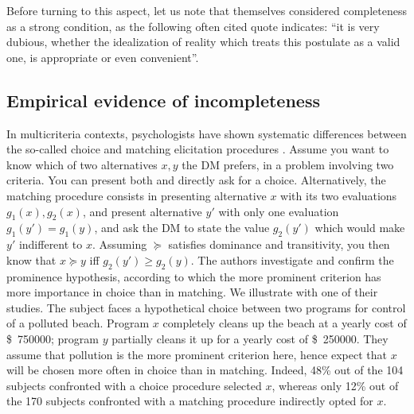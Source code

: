 \documentclass[french, english]{llncs}
\newcommand{\dollars}[1]{\SI{#1}[\$]{}}
\begin{document}
	Before turning to this aspect, let us note that \citet[p. 630]{von_neumann_theory_1953} \citep[also]{von_neumann_theory_2004} themselves considered completeness as a strong condition, as the following often cited quote indicates: “it is very dubious, whether the idealization of reality which treats this postulate as a valid one, is appropriate or even convenient”.

	\subsection{Empirical evidence of incompleteness}
	
	In multicriteria contexts, psychologists have shown systematic differences between the so-called choice and matching elicitation procedures \citep{tversky_contingent_1988}. Assume you want to know which of two alternatives $x, y$ the \ac{DM} prefers, in a problem involving two criteria. You can present both and directly ask for a choice. Alternatively, the matching procedure consists in presenting alternative $x$ with its two evaluations $g_1(x), g_2(x)$, and present alternative $y'$ with only one evaluation $g_1(y') = g_1(y)$, and ask the \ac{DM} to state the value $g_2(y')$ which would make $y'$ indifferent to $x$. Assuming $\succeq$ satisfies dominance and transitivity, you then know that $x \succeq y$ iff $g_2(y') ≥ g_2(y)$. The authors investigate and confirm the prominence hypothesis, according to which the more prominent criterion has more importance in choice than in matching. We illustrate with one of their studies. The subject faces a hypothetical choice between two programs for control of a polluted beach. Program $x$ completely cleans up the beach at a yearly cost of \dollars{750 000}; program $y$ partially cleans it up for a yearly cost of \dollars{250 000}. They assume that pollution is the more prominent criterion here, hence expect that $x$ will be chosen more often in choice than in matching. Indeed, 48\% out of the 104 subjects confronted with a choice procedure selected $x$, whereas only 12\% out of the 170 subjects confronted with a matching procedure indirectly opted for $x$.
	
\end{document}

